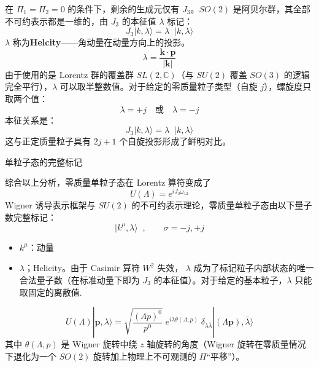 在 $\Pi_1 = \Pi_2 = 0$ 的条件下，剩余的生成元仅有 $J_3$。$SO(2)$ 是阿贝尔群，其全部不可约表示都是一维的，由 $J_3$ 的本征值 $\lambda$ 标记：
\begin{equation}
J_3|k,\lambda\rangle = \lambda\;\;|k,\lambda\rangle
\end{equation}
$\lambda$ 称为\textbf{Helcity}——角动量在动量方向上的投影。
\begin{equation}
\lambda = \frac{\pmb{k} \cdot \pmb{p}}{|\pmb{k}|}
\end{equation}
由于使用的是 Lorentz 群的覆盖群 $SL(2,\mathbb{C})$（与 $SU(2)$ 覆盖 $SO(3)$ 的逻辑完全平行），$\lambda$ 可以取半整数值。对于给定的零质量粒子类型（自旋 $j$），螺旋度只取两个值：
\begin{equation}
\lambda = +j \quad \text{或} \quad \lambda = -j
\end{equation}
本征关系是：
\begin{equation}
  J_3|k,\lambda\rangle = \lambda\;\;|k,\lambda\rangle
\end{equation}
这与正定质量粒子具有 $2j+1$ 个自旋投影形成了鲜明对比。
\begin{center}\vspace{2ex}
 \large 单粒子态的完整标记
\vspace{2ex}\end{center}
综合以上分析，零质量单粒子态在 Lorentz 算符变成了
\begin{equation}
    U(\Lambda)=e^{iJ_3\omega_{12}}
\end{equation}
 Wigner 诱导表示框架与 $SU(2)$ 的不可约表示理论，零质量单粒子态由以下量子数完整标记：
\begin{equation}
|k^\mu,\lambda\rangle\;\;,\qquad \sigma = -j,+j
\end{equation}
\begin{itemize}
    \item $k^\mu$：动量
    \item $\lambda$；Helicity。由于 Casimir 算符 $W^2$ 失效，  $\lambda$ 成为了标记粒子内部状态的唯一合法量子数（在标准动量下即为 $J_3$ 的本征值）。对于给定的基本粒子，$\lambda$ 只能取固定的离散值.\normalcolor
\end{itemize}
\begin{equation}
U(\Lambda)|\mathbf{p},\lambda\rangle
= \sqrt{\frac{(\Lambda p)^0}{p^0}}\;
e^{i\lambda\theta(\Lambda,p)}\;\delta_{\lambda\bar{\lambda}}
|(\Lambda\mathbf{p}),\bar{\lambda}\rangle
\end{equation}
其中 $\theta(\Lambda,p)$ 是 Wigner 旋转中绕 $z$ 轴旋转的角度（Wigner 旋转在零质量情况下退化为一个 $SO(2)$ 旋转加上物理上不可观测的 $\Pi$``平移''）。
